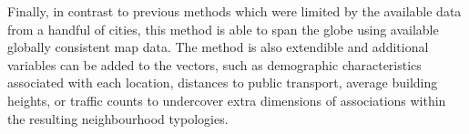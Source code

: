 Finally, in contrast to previous methods which were limited by the available data from a handful of cities, this method is able to span the globe using available globally consistent map data. The method is also extendible and additional variables can be added to the vectors, such as demographic characteristics associated with each location\cite{Kropp1998}, distances to public transport, average building heights, or traffic counts to undercover extra dimensions of associations within the resulting neighbourhood typologies.




